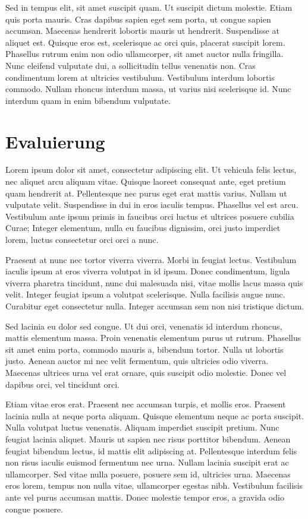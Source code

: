 \documentclass[12pt,twoside,a4paper,parskip]{scrbook}
\begin{document}
Sed in tempus elit, sit amet suscipit quam. Ut suscipit dictum molestie. Etiam quis porta mauris. Cras dapibus sapien eget sem porta, ut congue sapien accumsan. Maecenas hendrerit lobortis mauris ut hendrerit. Suspendisse at aliquet est. Quisque eros est, scelerisque ac orci quis, placerat suscipit lorem. Phasellus rutrum enim non odio ullamcorper, sit amet auctor nulla fringilla. Nunc eleifend vulputate dui, a sollicitudin tellus venenatis non. Cras condimentum lorem at ultricies vestibulum. Vestibulum interdum lobortis commodo. Nullam rhoncus interdum massa, ut varius nisi scelerisque id. Nunc interdum quam in enim bibendum vulputate.


\chapter{Evaluierung}

Lorem ipsum dolor sit amet, consectetur adipiscing elit. Ut vehicula felis lectus, nec aliquet arcu aliquam vitae. Quisque laoreet consequat ante, eget pretium quam hendrerit at. Pellentesque nec purus eget erat mattis varius. Nullam ut vulputate velit. Suspendisse in dui in eros iaculis tempus. Phasellus vel est arcu. Vestibulum ante ipsum primis in faucibus orci luctus et ultrices posuere cubilia Curae; Integer elementum, nulla eu faucibus dignissim, orci justo imperdiet lorem, luctus consectetur orci orci a nunc.

Praesent at nunc nec tortor viverra viverra. Morbi in feugiat lectus. Vestibulum iaculis ipsum at eros viverra volutpat in id ipsum. Donec condimentum, ligula viverra pharetra tincidunt, nunc dui malesuada nisi, vitae mollis lacus massa quis velit. Integer feugiat ipsum a volutpat scelerisque. Nulla facilisis augue nunc. Curabitur eget consectetur nulla. Integer accumsan sem non nisi tristique dictum.

Sed lacinia eu dolor sed congue. Ut dui orci, venenatis id interdum rhoncus, mattis elementum massa. Proin venenatis elementum purus ut rutrum. Phasellus sit amet enim porta, commodo mauris a, bibendum tortor. Nulla ut lobortis justo. Aenean auctor mi nec velit fermentum, quis ultricies odio viverra. Maecenas ultrices urna vel erat ornare, quis suscipit odio molestie. Donec vel dapibus orci, vel tincidunt orci.

Etiam vitae eros erat. Praesent nec accumsan turpis, et mollis eros. Praesent lacinia nulla at neque porta aliquam. Quisque elementum neque ac porta suscipit. Nulla volutpat luctus venenatis. Aliquam imperdiet suscipit pretium. Nunc feugiat lacinia aliquet. Mauris ut sapien nec risus porttitor bibendum. Aenean feugiat bibendum lectus, id mattis elit adipiscing at. Pellentesque interdum felis non risus iaculis euismod fermentum nec urna. Nullam lacinia suscipit erat ac ullamcorper. Sed vitae nulla posuere, posuere sem id, ultricies urna. Maecenas eros lorem, tempus non nulla vitae, ullamcorper egestas nibh. Vestibulum facilisis ante vel purus accumsan mattis. Donec molestie tempor eros, a gravida odio congue posuere.
\end{document}
